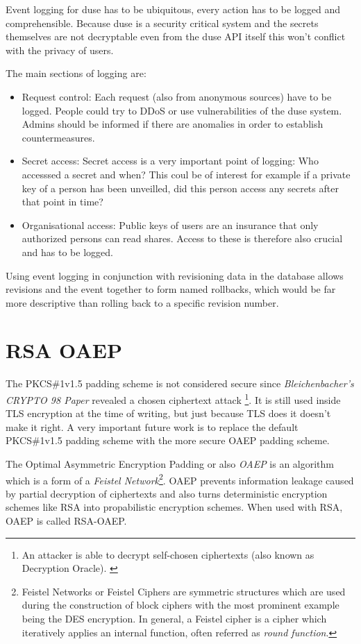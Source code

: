 Event logging for duse has to be ubiquitous, every action has to be
logged and comprehensible. Because duse is a security critical system
and the secrets themselves are not decryptable even from the duse API
itself this won't conflict with the privacy of users.

The main sections of logging are:
\begin{itemize}
  \item Request control: Each request (also from anonymous sources) have
  to be logged. People could try to DDoS or use vulnerabilities of the
  duse system. Admins should be informed if there are anomalies in order
  to establish countermeasures.

  \item Secret access: Secret access is a very important point of logging:
  Who accesssed a secret and when? This coul be of interest for example if
  a private key of a person has been unveilled, did this person access any
  secrets after that point in time?

  \item Organisational access: Public keys of users are an insurance that
  only authorized persons can read shares. Access to these is therefore
  also crucial and has to be logged.
\end{itemize}

Using event logging in conjunction with revisioning data in the database allows
revisions and the event together to form named rollbacks, which would be far
more descriptive than rolling back to a specific revision number.

\section{RSA OAEP}

The PKCS\#1v1.5 padding scheme is not considered secure since
\textit{Bleichenbacher's CRYPTO 98 Paper} \cite{rsabulletin}
revealed a chosen ciphertext attack \footnote{
  An attacker is able to decrypt self-chosen ciphertexts (also
  known as Decryption Oracle). \cite[p. 70]{baumann2014kryptographische}
}.
It is still used inside TLS encryption at the time of writing,
but just because TLS does it doesn't make it right. A very important
future work is to replace the default PKCS\#1v1.5 padding scheme with
the more secure OAEP padding scheme.

The Optimal Asymmetric Encryption Padding or also \textit{OAEP}
is an algorithm which is a form of a \textit{Feistel Network}\footnote{
  Feistel Networks or Feistel Ciphers are symmetric structures which are used
  during the construction of block ciphers with the most prominent example
  being the DES encryption. In general, a Feistel cipher is a cipher which
  iteratively applies an internal function, often referred as \textit{round function}.
}. OAEP prevents information leakage caused by partial decryption of 
ciphertexts and also turns deterministic encryption schemes like RSA into
propabilistic encryption schemes. When used with RSA, OAEP is called
RSA-OAEP.

